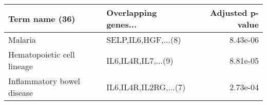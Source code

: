 \begin{tabular}{llr}
\toprule
            Term name (36) &  Overlapping genes... &  Adjusted p-value \\
\midrule
                   Malaria &   SELP,IL6,HGF,...(8) &          8.43e-06 \\
Hematopoietic cell lineage &   IL6,IL4R,IL7,...(9) &          8.81e-05 \\
Inflammatory bowel disease & IL6,IL4R,IL2RG,...(7) &          2.73e-04 \\
\bottomrule
\end{tabular}
